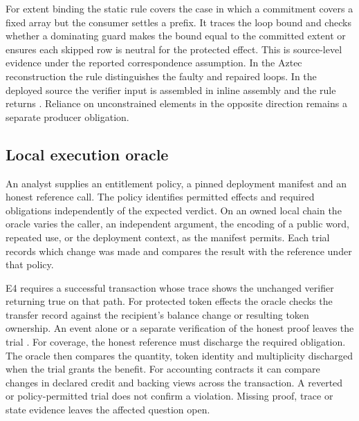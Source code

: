 For extent binding the static rule covers the case in which a commitment
covers a fixed array but the consumer settles a prefix. It traces the loop
bound and checks whether a dominating guard makes the bound equal to the
committed extent or ensures each skipped row is neutral for the protected
effect. This is source-level evidence under the reported correspondence
assumption. In the Aztec reconstruction the rule distinguishes the faulty
and repaired loops. In the deployed source the verifier input is assembled
in inline assembly and the rule returns \UNK{}. Reliance on unconstrained
elements in the opposite direction remains a separate producer obligation.

\subsection{Local execution oracle}\label{sec:oracle}
An analyst supplies an entitlement policy, a pinned deployment manifest and
an honest reference call. The policy identifies permitted effects and
required obligations independently of the expected verdict. On an owned
local chain the oracle varies the caller, an independent argument, the
encoding of a public word, repeated use, or the deployment context, as the
manifest permits. Each trial records which change was made and compares the
result with the reference under that policy.

E4 requires a successful transaction whose trace shows the unchanged verifier
returning true on that path. For protected token effects the oracle checks
the transfer record against the recipient's balance change or resulting
token ownership. An event alone or a separate verification of the honest
proof leaves the trial \UNK{}. For coverage, the honest reference must
discharge the required obligation. The oracle then compares the quantity,
token identity and multiplicity discharged when the trial grants the benefit.
For accounting contracts it can compare changes in declared credit and
backing views across the transaction. A reverted or policy-permitted trial
does not confirm a violation. Missing proof, trace or state evidence leaves
the affected question open.
